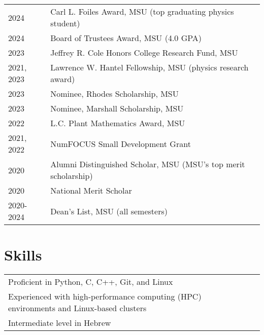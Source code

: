 \documentclass[letterpaper,12pt]{article}
\begin{document}
\begin{tabularx}{\linewidth}{@{}l X@{}}	
2024 & Carl L. Foiles Award, MSU (top graduating physics student) \\
2024 & Board of Trustees Award, MSU (4.0 GPA) \\
2023 & Jeffrey R. Cole Honors College Research Fund, MSU \\
2021, 2023 & Lawrence W. Hantel Fellowship, MSU (physics research award) \\
2023 & Nominee, Rhodes Scholarship, MSU \\
2023 & Nominee, Marshall Scholarship, MSU \\
2022 & L.C. Plant Mathematics Award, MSU \\
2021, 2022 & NumFOCUS Small Development Grant \\
2020 & Alumni Distinguished Scholar, MSU (MSU's top merit scholarship) \\
2020 & National Merit Scholar \\
2020-2024 & Dean's List, MSU (all semesters) \\
\end{tabularx}


\section{Skills}

\begin{tabularx}{\linewidth}{@{}l X@{}}
Proficient in Python, C, C++, Git, and Linux \\
Experienced with high-performance computing (HPC) environments and Linux-based clusters \\
Intermediate level in Hebrew \\
\end{tabularx}

\vfill
{}
\end{document}
